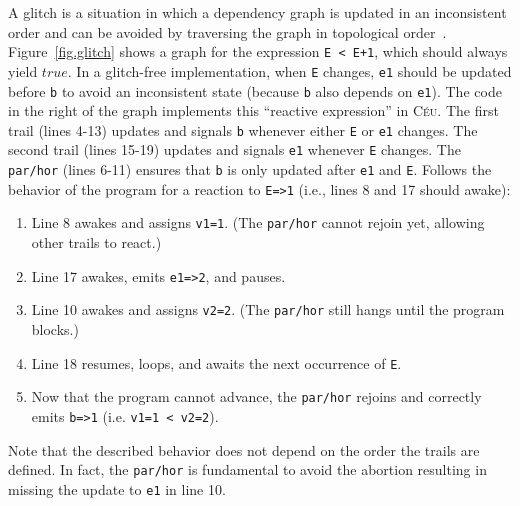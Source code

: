 \documentclass{acm_proc_article-sp}
\newcommand{\CEU}{\textsc{C\'{e}u}\xspace}
\newcommand{\code}[1] {{\small{\texttt{#1}}}}
\newcommand{\1}{\;}
\newcommand{\2}{\;\;}
\newcommand{\3}{\;\;\;}
\newcommand{\5}{\;\;\;\;\;}
\begin{document}
A glitch is a situation in which a dependency graph is updated in an 
inconsistent order and can be avoided by traversing the graph in topological 
order~\cite{frtime.embedding,frp.survey}.
%
Figure~\ref{fig.glitch} shows a graph for the expression \code{E~<~E+1}, which 
should always yield $true$.
In a glitch-free implementation, when \code{E} changes, \code{e1} should be 
updated before \code{b} to avoid an inconsistent state (because \code{b} also 
depends on \code{e1}).
%
The code in the right of the graph implements this ``reactive expression'' in 
\CEU.
The first trail (lines 4-13) updates and signals \code{b} whenever either 
\code{E} or \code{e1} changes.
The second trail (lines 15-19) updates and signals \code{e1} whenever \code{E} 
changes.
%
The \code{par/hor} (lines 6-11) ensures that \code{b} is only updated after 
\code{e1} and \code{E}.
%
Follows the behavior of the program for a reaction to \code{E=>1} (i.e., lines 
8 and 17 should awake):

{\small
\begin{enumerate}
\setlength{\itemsep}{0pt}
\item Line 8 awakes and assigns \code{v1=1}.
      (The \code{par/hor} cannot rejoin yet, allowing other trails to react.)
\item Line 17 awakes, emits \code{e1=>2}, and pauses.
\item Line 10 awakes and assigns \code{v2=2}.
      (The \code{par/hor} still hangs until the program blocks.)
\item Line 18 resumes, loops, and awaits the next occurrence of \code{E}.
\item Now that the program cannot advance, the \code{par/hor} rejoins and 
        correctly emits \code{b=>1} (i.e. \code{v1=1 < v2=2}).
\end{enumerate}
}

Note that the described behavior does not depend on the order the trails are 
defined.
In fact, the \code{par/hor} is fundamental to avoid the abortion resulting in 
missing the update to \code{e1} in line 10.
\end{document}
